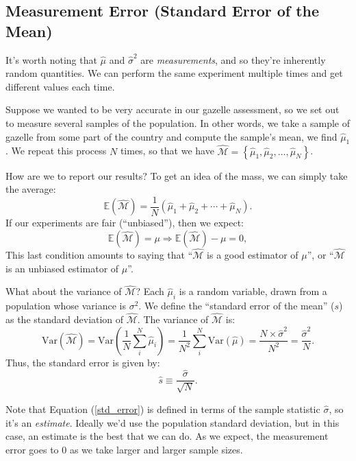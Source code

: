 \documentclass{article}
\numberwithin{equation}{section}
\begin{document}
\subsection{Measurement Error (Standard Error of the Mean)}

It's worth noting that $\hat{\mu}$ and $\hat{\sigma}^2$ are \textit{measurements}, and so they're inherently random quantities. We can perform the same experiment multiple times and get different values each time.

Suppose we wanted to be very accurate in our gazelle assessment, so we set out to measure several samples of the population. In other words, we take a sample of gazelle from some part of the country and compute the sample's mean, we find $\hat{\mu}_1$. We repeat this process $N$ times, so that we have $\hat{\mathcal{M}} = \left\lbrace\hat{\mu}_1,\hat{\mu}_2,\ldots,\hat{\mu}_N\right\rbrace$.

How are we to report our results? To get an idea of the mass, we can simply take the average:
\begin{equation}
	\mathbb{E}(\hat{\mathcal{M}}) = \frac{1}{N}\left(\hat{\mu}_1 + \hat{\mu}_2 + \cdots + \hat{\mu}_N\right).
\end{equation}
If our experiments are fair (``unbiased''), then we expect:
\begin{equation}
	\mathbb{E}(\hat{\mathcal{M}}) = \mu \Rightarrow \mathbb{E}(\hat{\mathcal{M}}) - \mu = 0,
\end{equation}
This last condition amounts to saying that ``$\hat{\mathcal{M}}$ is a good estimator of $\mu$'', or ``$\hat{\mathcal{M}}$ is an unbiased estimator of $\mu$''.

What about the variance of $\hat{\mathcal{M}}$? Each $\hat{\mu}_i$ is a random variable, drawn from a population whose variance is $\sigma^2$. We define the ``standard error of the mean'' ($s$) as the standard deviation of $\hat{\mathcal{M}}$. The variance of $\hat{\mathcal{M}}$ is:
\begin{equation}
	\mathrm{Var}\left(\hat{\mathcal{M}}\right) = \mathrm{Var}\left(\frac{1}{N}\sum_i^N \hat{\mu}_i\right) = \frac{1}{N^2}\sum_i^N \mathrm{Var}(\hat{\mu}) = \frac{N\times\hat{\sigma}^2}{N^2} = \frac{\hat{\sigma}^2}{N}.
\end{equation}
Thus, the standard error is given by:
\begin{equation} \label{std_error}
	\hat{s} \equiv \frac{\hat{\sigma}}{\sqrt{N}}.
\end{equation}

Note that Equation (\ref{std_error}) is defined in terms of the sample statistic $\hat{\sigma}$, so it's an \textit{estimate}. Ideally we'd use the population standard deviation, but in this case, an estimate is the best that we can do. As we expect, the measurement error goes to 0 as we take larger and larger sample sizes.
\end{document}
